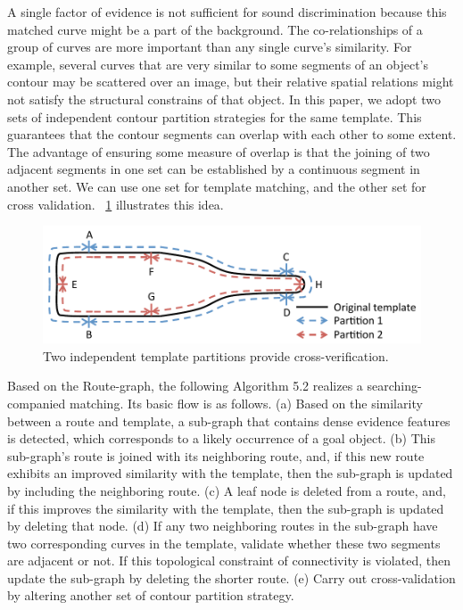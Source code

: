 \documentclass[journal]{IEEEtran}
\begin{document}
A single factor of evidence is not sufficient for sound discrimination because this matched curve might be a part of the background. 
The co-relationships of a group of curves are more important than any single curve's similarity. 
For example, several curves that are very similar to some segments of an object's contour may be scattered over an image, but their relative spatial relations might not satisfy the structural constrains of that object. 
In this paper, we adopt two sets of independent contour partition strategies for the same template. This guarantees that the contour segments can overlap with each other to some extent. The advantage of ensuring some measure of overlap is that the joining of two adjacent segments in one set can be established by a continuous segment in another set.
We can use one set for template matching, and the other set for cross validation. 
\figurename~\ref{fig:16} illustrates this idea.

\begin{figure}[!t]
\centering
\includegraphics[width=0.7\linewidth]{images/fig16.pdf}
\caption{Two independent template partitions provide cross-verification.}
\label{fig:16}
\end{figure}

Based on the Route-graph, the following Algorithm 5.2 realizes a searching-companied matching. 
Its basic flow is as follows. 
(a) Based on the similarity between a route and template, 
a sub-graph that contains dense evidence features is detected, 
which corresponds to a likely occurrence of a goal object. 
(b) This sub-graph's route is joined with its neighboring route, 
and, if this new route exhibits an improved similarity with the template, 
then the sub-graph is updated by including the neighboring route. 
(c) A leaf node is deleted from a route, 
and, if this improves the similarity with the template, 
then the sub-graph is updated by deleting that node. 
(d) If any two neighboring routes in the sub-graph have two corresponding curves in the template, 
validate whether these two segments are adjacent or not. 
If this topological constraint of connectivity is violated, 
then update the sub-graph by deleting the shorter route. 
(e) Carry out cross-validation by altering another set of contour partition strategy.
\end{document}
